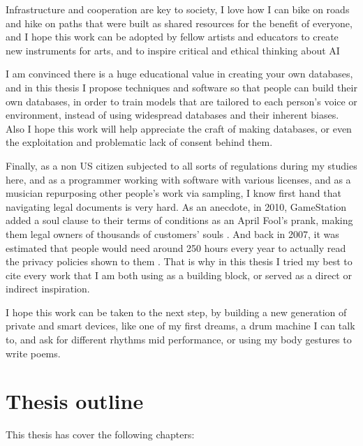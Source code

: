 Infrastructure and cooperation are key to society, I love how I can bike on roads and hike on paths that were built as shared resources for the benefit of everyone, and I hope this work can be adopted by fellow artists and educators to create new instruments for arts, and to inspire critical and ethical thinking about \acrshort{AI}

I am convinced there is a huge educational value in creating your own databases, and in this thesis I propose techniques and software so that people can build their own databases, in order to train models that are tailored to each person's voice or environment, instead of using widespread databases and their inherent biases. Also I hope this work will help appreciate the craft of making databases, or even the exploitation and problematic lack of consent behind them.

Finally, as a non US citizen subjected to all sorts of regulations during my studies here, and as a programmer working with software with various licenses, and as a musician repurposing other people's work via sampling, I know first hand that navigating legal documents is very hard. As an anecdote, in 2010, GameStation added a soul clause to their terms of conditions as an April Fool's prank, making them legal owners of thousands of customers' souls \cite{website-huffpost-gamestation-soul-clause}. And back in 2007, it was estimated that people would need around 250 hours every year to actually read the privacy policies shown to them \cite{article-cost-of-reading-privacy-policies}. That is why in this thesis I tried my best to cite every work that I am both using as a building block, or served as a direct or indirect inspiration.

I hope this work can be taken to the next step, by building a new generation of private and smart devices, like one of my first dreams, a drum machine I can talk to, and ask for different rhythms mid performance, or using my body gestures to write poems.

\section{Thesis outline}

This thesis has cover the following chapters:

